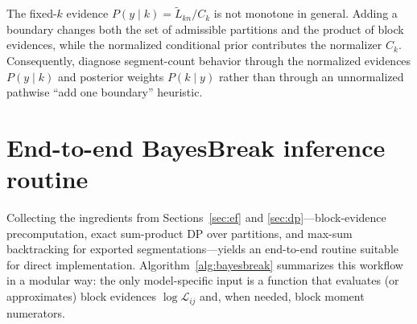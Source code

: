 \begin{remark}
\label{prop:mono-k}
The fixed-$k$ evidence $P(y\mid k)=\widetilde L_{kn}/C_k$ is not monotone in general. Adding a boundary changes both the set of admissible partitions and
the product of block evidences, while the normalized conditional prior contributes the normalizer
$C_k$. Consequently, diagnose segment-count behavior through the normalized evidences
$P(y\mid k)$ and posterior weights $P(k\mid y)$ rather than through an unnormalized pathwise
``add one boundary'' heuristic.
\end{remark}

\section{End-to-end BayesBreak inference routine}\label{sec:dp-alg}
Collecting the ingredients from Sections~\ref{sec:ef} and \ref{sec:dp}---block-evidence precomputation,
exact sum-product DP over partitions, and max-sum backtracking for exported segmentations---yields an
end-to-end routine suitable for direct implementation. Algorithm~\ref{alg:bayesbreak} summarizes
this workflow in a modular way: the only model-specific input is a function that evaluates (or
approximates) block evidences $\log \mathcal{L}_{ij}$ and, when needed, block moment numerators.


